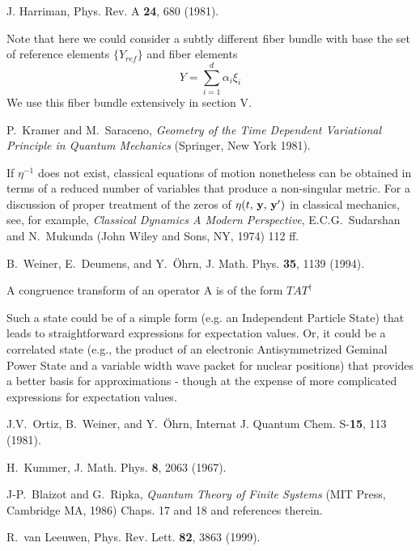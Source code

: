 \begin{references}
 J. Harriman, Phys. Rev. A {\bf 24}, 680 (1981).

 Note that here we could consider a subtly different
fiber bundle with base the set of reference elements $\{Y_{ref}\}$ and fiber
elements 
\[
Y=\sum_{i=1}^{d}\alpha _{i}\xi _{i} 
\]%
We use this fiber bundle extensively in section V.

 P.~Kramer and M.~Saraceno, {\it Geometry of the Time
Dependent Variational Principle in Quantum Mechanics} (Springer, New York
1981).

 If $\eta^{-1}$ does not exist, classical equations of
motion nonetheless can be obtained in terms of a reduced number of variables
that produce a non-singular metric. For a discussion of proper treatment of
the zeros of $\eta(t,\, {\bf y},\, {\bf y}^{\prime}) $ in classical
mechanics, see, for example, {\it Classical Dynamics A Modern Perspective},
E.C.G.~Sudarshan and N.~Mukunda (John Wiley and Sons, NY, 1974) 112 ff.

 B.~Weiner, E.~Deumens, and Y.~\"{O}hrn, J. Math. Phys. {\bf %
35}, 1139 (1994).

 A congruence transform of an operator A is of the form $%
TAT^{\dag }$

 Such a state could be of a simple form (e.g. an
Independent Particle State) that leads to straightforward expressions for
expectation values. Or, it could be a correlated state (e.g., the product of
an electronic Antisymmetrized Geminal Power State \cite{Ortiz81} and a
variable width wave packet for nuclear positions) that provides a better
basis for approximations - though at the expense of more complicated
expressions for expectation values.

 J.V.~Ortiz, B.~Weiner, and Y.~\"Ohrn, Internat J. Quantum
Chem. S-{\bf 15}, 113 (1981).

 H.~Kummer, J. Math. Phys. {\bf 8}, 2063 (1967).

 J-P.~Blaizot and G.~Ripka, {\it Quantum Theory of Finite
Systems} (MIT Press, Cambridge MA, 1986) Chaps. 17 and 18 and references
therein.

 R.~van Leeuwen, Phys. Rev. Lett. {\bf 82}, 3863 (1999).


\end{references}
